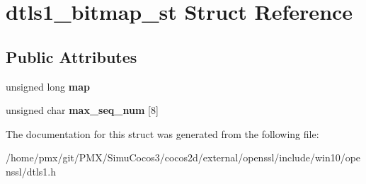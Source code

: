 \hypertarget{structdtls1__bitmap__st}{}\section{dtls1\+\_\+bitmap\+\_\+st Struct Reference}
\label{structdtls1__bitmap__st}
\subsection*{Public Attributes}
\begin{DoxyCompactItemize}
\item 
\mbox{\label{structdtls1__bitmap__st_a1b23acab32785f0a6780921565166622}} 
unsigned long {\bfseries map}
\item 
\mbox{\label{structdtls1__bitmap__st_aab16a8e227150f8bb745ea006b798221}} 
unsigned char {\bfseries max\+\_\+seq\+\_\+num} \mbox{[}8\mbox{]}
\end{DoxyCompactItemize}


The documentation for this struct was generated from the following file\+:\begin{DoxyCompactItemize}
\item 
/home/pmx/git/\+P\+M\+X/\+Simu\+Cocos3/cocos2d/external/openssl/include/win10/openssl/dtls1.\+h\end{DoxyCompactItemize}
